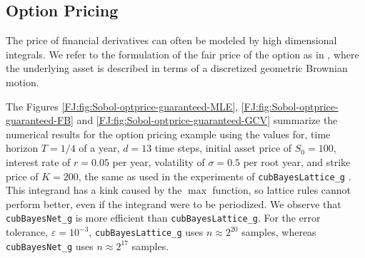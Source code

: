 \documentclass[graybox,footinfo]{svmult}
\begin{document}
\subsection{Option Pricing}

The price of financial derivatives can often be modeled by high dimensional integrals. 
We refer to the formulation of the fair price of the option as in \cite{RatHic19a}, where the underlying asset is described in terms of a discretized geometric Brownian motion.

The Figures \ref{FJ:fig:Sobol-optprice-guaranteed-MLE}, \ref{FJ:fig:Sobol-optprice-guaranteed-FB} and 
\ref{FJ:fig:Sobol-optprice-guaranteed-GCV} summarize the numerical results for the option pricing example using the values for,
time horizon $T = 1/4$ of a year, $d = 13$ time steps, initial asset price of $S_0 = 100$, interest rate of $r =  0.05$ per year, volatility of $\sigma = 0.5$ per root year, and strike price of  $K = 200$, the same as used in the experiments of \texttt{cubBayesLattice\_g} \cite{RatHic19a}.
This integrand has a kink caused by the $\max$ function, so lattice rules cannot perform better, even if the integrand were to be periodized.  We observe that \texttt{cubBayesNet\_g} is more efficient than \texttt{cubBayesLattice\_g}.  For the error tolerance, $\varepsilon=10^{-3}$,  \texttt{cubBayesLattice\_g} uses $n \approx 2^{20}$ samples, whereas \texttt{cubBayesNet\_g} uses $n \approx 2^{17}$ samples.
\end{document}
